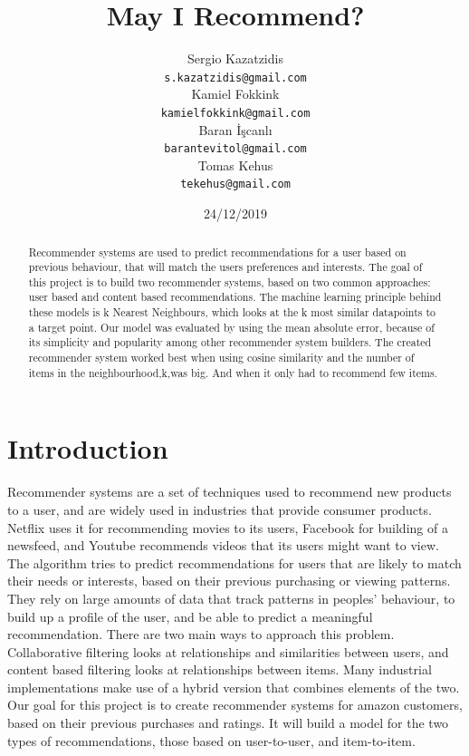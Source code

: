 \documentclass[11pt]{article}
\title{May I Recommend?}
\author{Sergio Kazatzidis \\
    {\tt s.kazatzidis@gmail.com} \\
    Kamiel Fokkink \\
    {\tt kamielfokkink@gmail.com} \\\And
    Baran İşcanlı \\
    {\tt barantevitol@gmail.com} \\
    Tomas Kehus \\
    {\tt tekehus@gmail.com}}
\date{24/12/2019}
\begin{document}
\maketitle
\begin{abstract}
    Recommender systems are used to predict recommendations for a user based on previous behaviour, that will match the users preferences and interests. The goal of this project is to build two recommender systems, based on two common approaches: user based and content based recommendations. The machine learning principle behind these models is k Nearest Neighbours, which looks at the k most similar datapoints to a target point. Our model was evaluated by using the mean absolute error, because of its simplicity and popularity among other recommender system builders. The created recommender system worked best when using cosine similarity and the number of items in the neighbourhood,k,was big. And when it only had to recommend few items.
\end{abstract}

\noindent

\section{Introduction}
Recommender systems are a set of techniques used to recommend new products to a user, and are widely used in industries that provide consumer products. Netflix uses it for recommending movies to its users, Facebook for building of a newsfeed, and Youtube recommends videos that its users might want to view. The algorithm tries to predict recommendations for users that are likely to match their needs or interests, based on their previous purchasing or viewing patterns. They rely on large amounts of data that track patterns in peoples' behaviour, to build up a profile of the user, and be able to predict a meaningful recommendation. There are two main ways to approach this problem. Collaborative filtering looks at relationships and similarities between users, and content based filtering looks at relationships between items. Many industrial implementations make use of a hybrid version that combines elements of the two. Our goal for this project is to create recommender systems for amazon customers, based on their previous purchases and ratings. It will build a model for the two types of recommendations, those based on user-to-user, and item-to-item.
\end{document}
